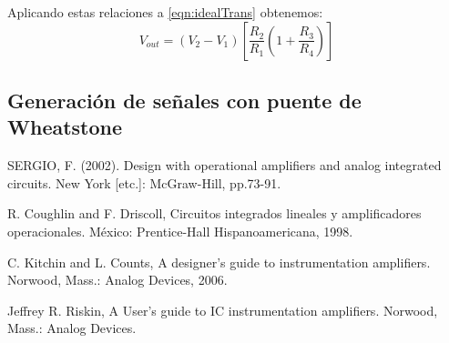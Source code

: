 \documentclass[a4paper]{article}
\begin{document}
	Aplicando estas relaciones a \eqref{eqn:idealTrans} obtenemos:
	\begin{equation}
		V_{out} = (V_2-V_1)\left[\frac{R_2}{R_1}(1+\frac{R_3}{R_4})\right]
	\end{equation}

\subsection{Generación de señales con puente de Wheatstone}

 	
\begin{thebibliography}{9}
	
	SERGIO, F. (2002). Design with operational amplifiers and analog integrated circuits. New York [etc.]: McGraw-Hill, pp.73-91.	
	
	R. Coughlin and F. Driscoll, Circuitos integrados lineales y amplificadores operacionales. México: Prentice-Hall Hispanoamericana, 1998.
	
	C. Kitchin and L. Counts, A designer's guide to instrumentation amplifiers. Norwood, Mass.: Analog Devices, 2006.
	
	Jeffrey R. Riskin, A User's guide to IC instrumentation amplifiers. Norwood, Mass.: Analog Devices.
	
\end{thebibliography}
\end{document}
